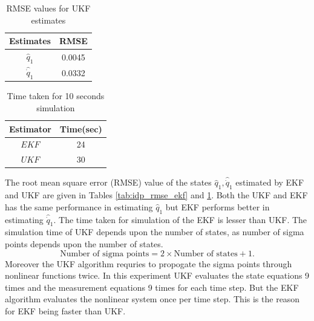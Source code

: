 \begin{table}[H]
    \centering
    \begin{tabular}{|c|c|}
    \hline
    Estimates &RMSE \\ \hline
    $\hat q_1$   &0.0045 \\ \hline
    $\hat {\dot q}_1$ & 0.0332 \\ \hline
    \end{tabular}
    \caption{RMSE values for UKF estimates}
    \label{tab:idp_rmse_ukf}
\end{table}

\begin{table}[H]
    \centering
    \begin{tabular}{|c|c|}
    \hline
    Estimator &Time(sec) \\ \hline
    $EKF$ &24 \\ \hline
    $UKF$ &30 \\ \hline
    \end{tabular}
    \caption{Time taken for 10 seconds simulation}
    \label{tab:idp_sim_time}
\end{table}
The root mean square error (RMSE) value of the states $\hat q_1, \hat{\dot q}_1 $ estimated by EKF and UKF are given in Tables \ref{tab:idp_rmse_ekf} and \ref{tab:idp_rmse_ukf}. Both the UKF and EKF has the same performance in estimating $\hat q_1$ but EKF performs better in estimating $\hat{\dot q}_1$. The time taken for simulation of the EKF is lesser than UKF. The simulation time of UKF depends upon the number of states, as number of sigma points depends upon the number of states. $$\text{Number of sigma points}=2\times \text{Number of states} +1.$$  Moreover the UKF algorithm requries to propogate the sigma points through nonlinear functions twice. In this experiment UKF evaluates the state equations 9 times and the measurement equations 9 times for each time step. But the EKF algorithm evaluates the nonlinear system once per time step. This is the reason for EKF being faster than UKF. 

